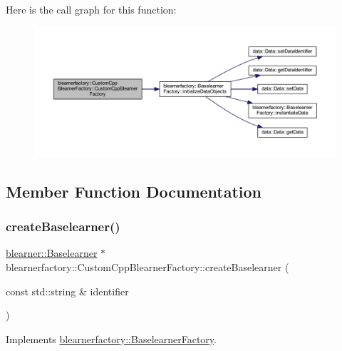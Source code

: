Here is the call graph for this function\+:\nopagebreak
\begin{figure}[H]
\begin{center}
\leavevmode
\includegraphics[width=350pt]{classblearnerfactory_1_1_custom_cpp_blearner_factory_a390de0fb001434b3252e5f723c55d7b3_cgraph}
\end{center}
\end{figure}


\subsection{Member Function Documentation}
\mbox{\label{classblearnerfactory_1_1_custom_cpp_blearner_factory_ac98fae043e6822605261c7c6f7125e8c}} 
\subsubsection{\texorpdfstring{create\+Baselearner()}{createBaselearner()}}
{\footnotesize\ttfamily \hyperlink{classblearner_1_1_baselearner}{blearner\+::\+Baselearner} $\ast$ blearnerfactory\+::\+Custom\+Cpp\+Blearner\+Factory\+::create\+Baselearner (\begin{DoxyParamCaption}\item[{const std\+::string \&}]{identifier }\end{DoxyParamCaption})\hspace{0.3cm}{\ttfamily [virtual]}}



Implements \hyperlink{classblearnerfactory_1_1_baselearner_factory_ac3584a20a84834099a15908690b837bb}{blearnerfactory\+::\+Baselearner\+Factory}.

